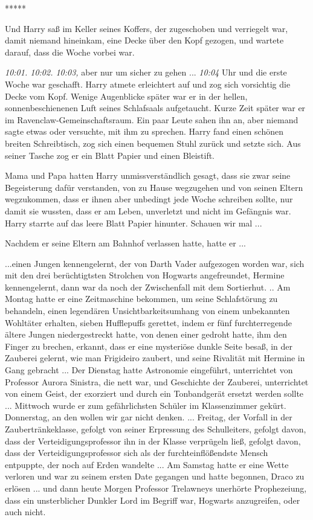 \begin{center}*****\end{center}

Und Harry saß im Keller seines Koffers, der zugeschoben und verriegelt war,
damit niemand hineinkam, eine Decke über den Kopf gezogen, und wartete darauf,
dass die Woche vorbei war.

\emph{10:01. 10:02. 10:03,} aber nur um sicher zu gehen ... \emph{10:04} Uhr und
die erste Woche war geschafft. Harry atmete erleichtert auf und zog sich
vorsichtig die Decke vom Kopf. Wenige Augenblicke später war er in der hellen,
sonnenbeschienenen Luft seines Schlafsaals aufgetaucht. Kurze Zeit später war er
im Ravenclaw-Gemeinschaftsraum. Ein paar Leute sahen ihn an, aber niemand sagte
etwas oder versuchte, mit ihm zu sprechen. Harry fand einen schönen breiten
Schreibtisch, zog sich einen bequemen Stuhl zurück und setzte sich. Aus seiner
Tasche zog er ein Blatt Papier und einen Bleistift.

Mama und Papa hatten Harry unmissverständlich gesagt, dass sie zwar seine
Begeisterung dafür verstanden, von zu Hause wegzugehen und von seinen Eltern
wegzukommen, dass er ihnen aber unbedingt jede Woche schreiben sollte, nur damit
sie wussten, dass er am Leben, unverletzt und nicht im Gefängnis war. Harry
starrte auf das leere Blatt Papier hinunter. Schauen wir mal ...

Nachdem er seine Eltern am Bahnhof verlassen hatte, hatte er ...

...einen Jungen kennengelernt, der von Darth Vader aufgezogen worden war, sich
mit den drei berüchtigtsten Strolchen von Hogwarts angefreundet, Hermine
kennengelernt, dann war da noch der Zwischenfall mit dem Sortierhut. .. Am
Montag hatte er eine Zeitmaschine bekommen, um seine Schlafstörung zu behandeln,
einen legendären Unsichtbarkeitsumhang von einem unbekannten Wohltäter erhalten,
sieben Hufflepuffs gerettet, indem er fünf furchterregende ältere Jungen
niedergestreckt hatte, von denen einer gedroht hatte, ihm den Finger zu brechen,
erkannt, dass er eine mysteriöse dunkle Seite besaß, in der Zauberei gelernt,
wie man Frigideiro zaubert, und seine Rivalität mit Hermine in Gang gebracht ...
Der Dienstag hatte Astronomie eingeführt, unterrichtet von Professor Aurora
Sinistra, die nett war, und Geschichte der Zauberei, unterrichtet von einem
Geist, der exorziert und durch ein Tonbandgerät ersetzt werden sollte ...
Mittwoch wurde er zum gefährlichsten Schüler im Klassenzimmer gekürt.
Donnerstag, an den wollen wir gar nicht denken. ... Freitag, der Vorfall in der
Zaubertränkeklasse, gefolgt von seiner Erpressung des Schulleiters, gefolgt
davon, dass der Verteidigungsprofessor ihn in der Klasse verprügeln ließ,
gefolgt davon, dass der Verteidigungsprofessor sich als der furchteinflößendste
Mensch entpuppte, der noch auf Erden wandelte ... Am Samstag hatte er eine Wette
verloren und war zu seinem ersten Date gegangen und hatte begonnen, Draco zu
erlösen ... und dann heute Morgen Professor Trelawneys unerhörte Prophezeiung,
dass ein unsterblicher Dunkler Lord im Begriff war, Hogwarts anzugreifen, oder
auch nicht.

